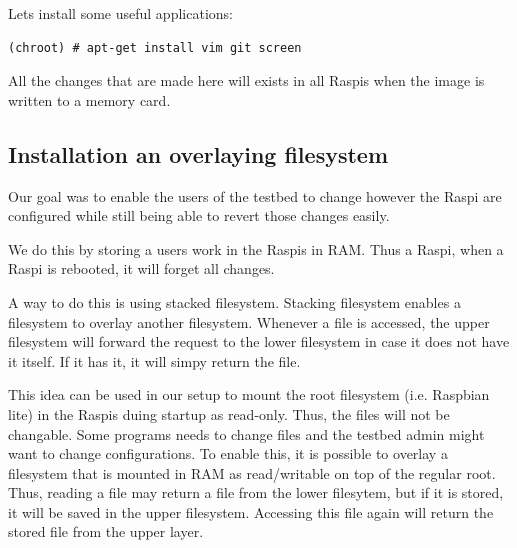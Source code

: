Lets install some useful applications:
\begin{lstlisting}[]
(chroot) # apt-get install vim git screen
\end{lstlisting}
\FloatBarrier
\vspace{-5mm}

All the changes that are made here will exists in all \ac{Raspi}s when the
image is written to a memory card.

\subsection{Installation an overlaying filesystem}

Our goal was to enable the users of the testbed to change however the
\ac{Raspi} are configured while still being able to revert those changes easily.

We do this by storing a users work in the \ac{Raspi}s in \ac{RAM}. Thus a
\ac{Raspi}, when a \ac{Raspi} is rebooted, it will forget all changes.

A way to do this is using stacked filesystem. Stacking filesystem enables
a filesystem to overlay another filesystem. Whenever a file is accessed,
the upper filesystem will forward the request to the lower filesystem in
case it does not have it itself. If it has it, it will simpy return the file.

This idea can be used in our setup to mount the root filesystem (i.e. Raspbian
lite) in the \ac{Raspi}s duing startup as read-only. Thus, the files will not
be changable. Some programs needs to change files and the testbed admin might
want to change configurations. To enable this, it is possible to
overlay a filesystem that is mounted in \ac{RAM} as read/writable on top of
the regular root. Thus, reading a file may return a file from the lower filesytem,
but if it is stored, it will be saved in the upper filesystem. Accessing this file
again will return the stored file from the upper layer.



%
%
%
%

